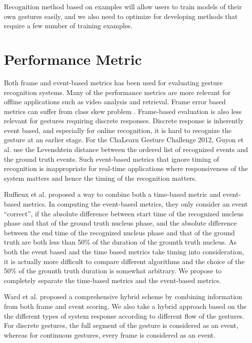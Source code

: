 \documentclass[conference]{IEEEtran}
\begin{document}
Recognition method based on examples will allow users to train models of their
own gestures easily, and we also need to optimize for developing methods that
require a few number of training examples.

\section{Performance Metric}
Both frame \cite{song12} and event-based \cite{guyon13} metrics has been
used for evaluating gesture recognition systems. Many of the performance metrics
are more relevant for offline applications such as video analysis and retrieval. Frame error based
metrics can suffer from class skew problem \cite{ward11}. Frame-based evaluation
is also less relevant for gestures requiring discrete responses. Discrete
response is inherently event based, and especially for online recognition, it is hard to
recognize the gesture at an earlier stage. For the ChaLearn
Gesture Challenge 2012, Guyon et al.
\cite{guyon13} use the Levenshtein distance between the ordered list of
recognized events and the ground truth events. Such event-based metrics that
ignore timing of recognition is inappropriate for real-time
applications where responsiveness of the system matters and hence the timing of
the recognition matters.

Ruffieux et al. proposed a way to combine both a time-based metric
\cite{Ruffieux2013} and event-based metrics. In computing the event-based
metrics, they only consider an event ``correct'', if the absolute difference between start time of the
recognized nucleus phase and that of the ground truth nucleus phase, and the
absolute difference between the end time of the recognized nucleus phase and
that of the ground truth are both less than 50\% of the duration of the grounth truth
nucleus. As both the event based and the time based metrics take timing into
consideration, it is actually more difficult to compare different algorithms and
the choice of the 50\% of the grounth truth duration is somewhat arbitrary. We
propose to completely separate the time-based metrics and the event-based
metrics.

Ward et al. \cite{ward11} proposed a comprehensive hybrid
scheme by combining information from both frame and event scoring. We also take
a hybrid approach based on the the different types of system response according to different flow of the gestures. 
For discrete gestures, the full segment of the gesture is considered as an
event, whereas for continuous gestures, every frame is considered as an event.
\end{document}
